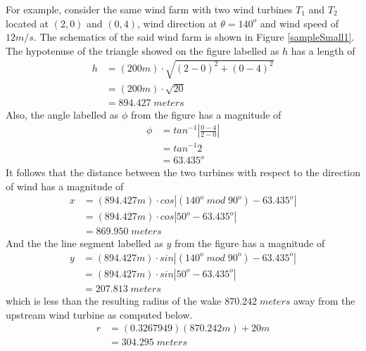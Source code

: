     For example, consider the same wind farm with two wind turbines $T_1$ and $T_2$ located at $(2,0)$ and $(0,4)$, wind direction at $\theta=140^o$ and wind speed of $12m/s$. The schematics of the said wind farm is shown in Figure \ref{sampleSmall1}. The hypotenuse of the triangle showed on the figure labelled as $h$ has a length of
    \begin{align*}
    	h
    	&= (200m)\cdot \sqrt{(2-0)^2+(0-4)^2} \\
    	&= (200m)\cdot \sqrt{20} \\
    	&= 894.427\;meters
    \end{align*}
    Also, the angle labelled as $\phi$ from the figure has a magnitude of
    \begin{align*}
    	\phi
    	&= tan^{-1} \left| \frac{0-4}{2-0} \right| \\
    	&= tan^{-1} 2 \\
    	&= 63.435^o
    \end{align*}
    It follows that the distance between the two turbines with respect to the direction of wind has a magnitude of
    \begin{align*}
    	x
    	&= (894.427m)\cdot cos\left| (140^o\;mod\;90^o)-63.435^o \right| \\
    	&= (894.427m)\cdot cos\left| 50^o-63.435^o \right| \\
    	&= 869.950\;meters
    \end{align*}
    And the the line segment labelled as $y$ from the figure has a magnitude of
    \begin{align*}
    	y
    	&= (894.427m)\cdot sin\left| (140^o\;mod\;90^o)-63.435^o \right| \\
    	&= (894.427m)\cdot sin\left| 50^o-63.435^o \right| \\
    	&= 207.813\;meters
    \end{align*}
    which is less than the resulting radius of the wake $870.242\;meters$ away from the upstream wind turbine as computed below.
    \begin{align*}
    	r
    	&= (0.3267949)(870.242m) + 20m \\
    	&= 304.295\;meters
    \end{align*}
    
